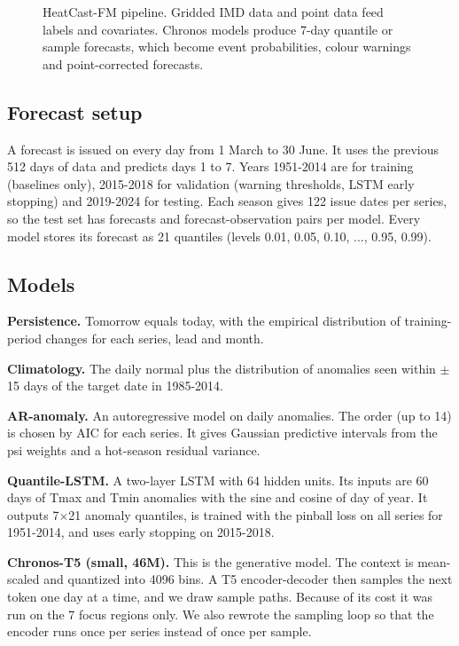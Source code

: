 \documentclass[conference,10pt]{IEEEtran}
\begin{document}
\begin{figure}[t]
\centering
\resizebox{\textwidth}{!}{}
\caption{HeatCast-FM pipeline. Gridded IMD data and point data feed labels and covariates. Chronos models produce 7-day quantile or sample forecasts, which become event probabilities, colour warnings and point-corrected forecasts.}
\label{fig:pipeline}
\end{figure}

\subsection{Forecast setup}
A forecast is issued on every day from 1 March to 30 June. It uses the previous 512 days of data and predicts days 1 to 7. Years 1951-2014 are for training (baselines only), 2015-2018 for validation (warning thresholds, LSTM early stopping) and 2019-2024 for testing. Each season gives 122 issue dates per series, so the test set has \NTestForecasts{} forecasts and \NTestPairs{} forecast-observation pairs per model. Every model stores its forecast as 21 quantiles (levels 0.01, 0.05, 0.10, ..., 0.95, 0.99).

\subsection{Models}
\textbf{Persistence.} Tomorrow equals today, with the empirical distribution of training-period changes for each series, lead and month.

\textbf{Climatology.} The daily normal plus the distribution of anomalies seen within $\pm$15 days of the target date in 1985-2014.

\textbf{AR-anomaly.} An autoregressive model on daily anomalies. The order (up to 14) is chosen by AIC for each series. It gives Gaussian predictive intervals from the psi weights and a hot-season residual variance.

\textbf{Quantile-LSTM.} A two-layer LSTM \cite{hochreiter1997lstm} with 64 hidden units. Its inputs are 60 days of Tmax and Tmin anomalies with the sine and cosine of day of year. It outputs 7$\times$21 anomaly quantiles, is trained with the pinball loss on all series for 1951-2014, and uses early stopping on 2015-2018.

\textbf{Chronos-T5 (small, 46M).} This is the generative model. The context is mean-scaled and quantized into 4096 bins. A T5 encoder-decoder then samples the next token one day at a time, and we draw \TFiveSamples{} sample paths. Because of its cost it was run on the 7 focus regions only. We also rewrote the sampling loop so that the encoder runs once per series instead of once per sample.
\end{document}
